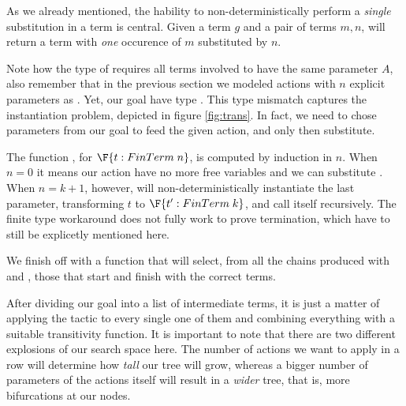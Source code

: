 As we already mentioned, the hability to non-deterministically perform a \emph{single} substitution
in a term is central. Given a term $g$ and a pair of terms $m , n$,  will return
a term with \emph{one} occurence of $m$ substituted by $n$. 


Note how the type of \F{$\_[\_] $} requires all terms involved to have the same parameter $A$,
also remember that in the previous section we modeled actions with $n$ explicit parameters as .
Yet, our goal have type . This type mismatch captures the instantiation problem,
depicted in figure \ref{fig:trans}. In fact, we need to chose parameters from our goal to feed
the given action, and only then substitute. 


The function , for $\F{t : FinTerm\; n}$, is computed by induction in $n$.
When $n = 0$ it means our action have no more free variables and we can substitute . 
When $n = k + 1$, however,  will non-deterministically
instantiate the last parameter, transforming $t$ to $\F{t' : FinTerm\; k}$, and call itself recursively.
The finite type workaround does not fully work to prove termination, which have to still be explicetly mentioned here.

We finish off with a function that will select, from all the chains produced with \F{$\_[\_]$} and ,
those that start and finish with the correct terms.


After dividing our goal into a list of intermediate terms, it is just a matter of applying the
tactic to every single one of them and combining everything with a suitable transitivity function.
It is important to note that there are two different explosions of our search space here. The
number of actions we want to apply in a row will determine how \emph{tall} our tree will grow,
whereas a bigger number of parameters of the actions itself will result in a \emph{wider} tree, that is,
more bifurcations at our nodes.

